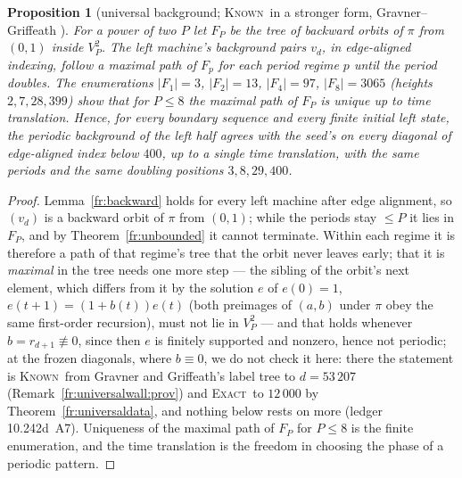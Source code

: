 \documentclass[11pt]{article}
\newtheorem{proposition}[theorem]{Proposition}
\theoremstyle{definition}
\theoremstyle{remark}
\newcommand{\EXACT}{\textsc{Exact}}
\newcommand{\KNOWN}{\textsc{Known}}
\begin{document}
\begin{proposition}[universal background; \KNOWN\ in a stronger form, Gravner--Griffeath {\cite[\S8]{GG}}]\label{fr:universalwall}
For a power of two $P$ let $F_P$ be the tree of backward orbits of $\pi$ from $(0,1)$ inside $V_P^2$. The left machine's background pairs $v_d$, in edge-aligned indexing, follow a maximal path of $F_{p}$ for each period regime $p$ until the period doubles. The enumerations $|F_1|=3$, $|F_2|=13$, $|F_4|=97$, $|F_8|=3065$ (heights $2,7,28,399$) show that for $P\le8$ the maximal path of $F_P$ is unique up to time translation. Hence, for every boundary sequence and every finite initial left state, the periodic background of the left half agrees with the seed's on every diagonal of edge-aligned index below $400$, up to a single time translation, with the same periods and the same doubling positions $3,8,29,400$.
\end{proposition}
\begin{proof}
Lemma~\ref{fr:backward} holds for every left machine after edge alignment, so $(v_d)$ is a backward orbit of $\pi$ from $(0,1)$; while the periods stay $\le P$ it lies in $F_P$, and by Theorem~\ref{fr:unbounded} it cannot terminate. Within each regime it is therefore a path of that regime's tree that the orbit never leaves early; that it is \emph{maximal} in the tree needs one more step --- the sibling of the orbit's next element, which differs from it by the solution $e$ of $e(0)=1$, $e(t+1)=(1+b(t))e(t)$ (both preimages of $(a,b)$ under $\pi$ obey the same first-order recursion), must not lie in $V_P^2$ --- and that holds whenever $b=r_{d+1}\not\equiv0$, since then $e$ is finitely supported and nonzero, hence not periodic; at the frozen diagonals, where $b\equiv0$, we do not check it here: there the statement is \KNOWN\ from Gravner and Griffeath's label tree to $d=53\,207$ \cite[\S8]{GG} (Remark~\ref{fr:universalwall:prov}) and \EXACT\ to $12\,000$ by Theorem~\ref{fr:universaldata}, and nothing below rests on more (ledger 10.242d~A7). Uniqueness of the maximal path of $F_P$ for $P\le8$ is the finite enumeration, and the time translation is the freedom in choosing the phase of a periodic pattern.
\end{proof}
\end{document}
